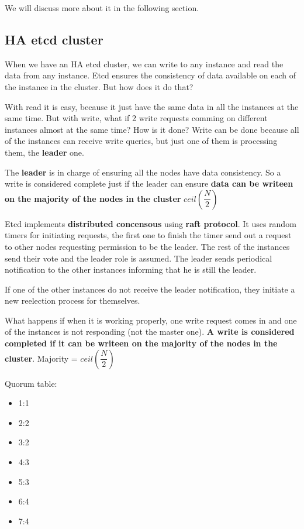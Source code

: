\documentclass{article}
\begin{document}
We will discuss more about it in the following section.

\subsection{HA etcd cluster}
When we have an HA etcd cluster, we can write to any instance and read the data from any instance.
Etcd ensures the consistency of data available on each of the instance in the cluster. But how does it do that?

With read it is easy, because it just have the same data in all the instances at the same time. But with write, what if 2 write requests comming on different instances almost at the same time? How is it done?
Write can be done because all of the instances can receive write queries, but just one of them is processing them, the \textbf{leader} one.

The \textbf{leader} is in charge of ensuring all the nodes have data consistency. So a write is considered complete just if the leader can ensure \textbf{data can be writeen on the majority of the nodes in the cluster} $ceil(\dfrac{N}{2})$

Etcd implements \textbf{distributed concensous} using \textbf{raft protocol}. It uses random timers for initiating requests, the first one to finish the timer send out a request to other nodes requesting permission to be the leader.
The rest of the instances send their vote and the leader role is assumed. The leader sends periodical notification to the other instances informing that he is still the leader.

If one of the other instances do not receive the leader notification, they initiate a new reelection process for themselves.

What happens if when it is working properly, one write request comes in and one of the instances is not responding (not the master one). \textbf{A write is considered completed if it can be writeen on the majority of the nodes in the cluster}. Majority = $ceil(\dfrac{N}{2})$

Quorum table:

\begin{itemize}
    \item 1:1
    \item 2:2
    \item 3:2
    \item 4:3
    \item 5:3
    \item 6:4
    \item 7:4
\end{itemize}
\end{document}
